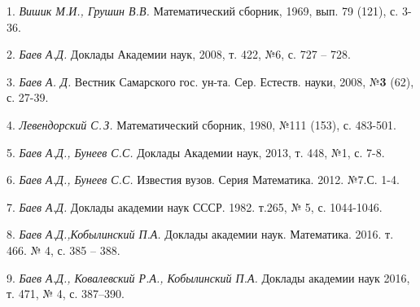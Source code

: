 \litlist

1. {\it Вишик М.И., Грушин В.В.} Математический сборник, 1969, вып. 79 (121), с.
3-36.

2. {\it Баев А.Д.} Доклады Академии наук, 2008, т. 422, №6, с. 727 -- 728.

3. {\it Баев А. Д.} Вестник Самарского гос. ун-та. Сер. Ес\-теств. науки, 2008,
№\textbf{3} (62), с. 27-39.

4. {\it Левендорский С.\,З.} Математический сборник, 1980, №111 (153), с. 483-501.

5. {\it Баев А.Д., Бунеев С.С.} Доклады Академии наук, 2013, т. 448, №1, с. 7-8.

6. {\it Баев А.Д., Бунеев С.С.} Известия вузов. Серия Математика. 2012. №7.С. 1-4.

7. {\it Баев А.Д.} Доклады академии наук СССР. 1982. т.265, № 5, с. 1044-1046.

8. {\it Баев А.Д.,Кобылинский П.А.} Доклады академии наук. Математика. 2016. т.
466. № 4, с. 385 -- 388.

9. {\it Баев А.Д., Ковалевский Р.А., Кобылинский П.А.} Доклады академии наук 2016,
т. 471, № 4, с. 387--390.






